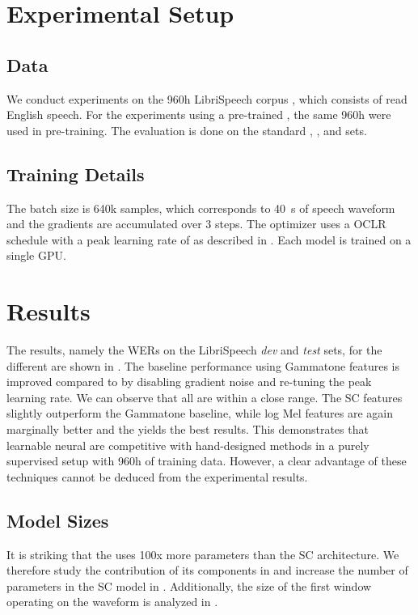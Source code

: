 \documentclass{INTERSPEECH2023}
\begin{document}
\section{Experimental Setup}
\subsection{Data}
We conduct experiments on the 960h LibriSpeech corpus \cite{panayotov2015librispeech}, which consists of read English speech.
For the experiments using a pre-trained \wvtwo \fe, the same 960h were used in pre-training.
The evaluation is done on the standard \devclean, \devother, \testclean and \testother sets.

\subsection{Training Details}
The batch size is 640k samples, which corresponds to \SI{40}{\second} of speech waveform and the gradients are accumulated over 3 steps.
The  optimizer uses a \gls{OCLR} schedule with a peak learning rate of  as described in .
Each model is trained on a single \gls{GPU}.

\section{Results}
The results, namely the \glspl{WER} on the LibriSpeech \textit{dev} and \textit{test} sets, for the different \fes are shown in .
The baseline performance using Gammatone features is improved compared to \cite{zhou2022efficient} by disabling gradient noise and re-tuning the peak learning rate.
We can observe that all \fes are within a close range.
The \gls{SC} features slightly outperform the Gammatone baseline, while log Mel features are again marginally better and the \wvtwo \fe yields the best results.
This demonstrates that learnable neural \fes are competitive with hand-designed methods in a purely supervised setup with 960h of training data.
However, a clear advantage of these techniques cannot be deduced from the experimental results.


\subsection{Model Sizes}
It is striking that the  \fe uses 100x more parameters than the \gls{SC} architecture.
We therefore study the contribution of its components in  and increase the number of parameters in the \gls{SC} model in .
Additionally, the size of the first window operating on the waveform is analyzed in .
\end{document}
